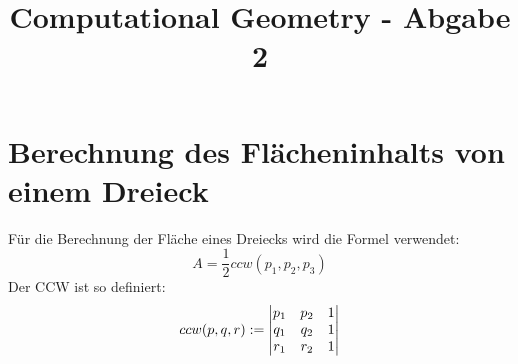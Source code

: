 \documentclass[conference]{IEEEtran}
\begin{document}
	
	\title{Computational Geometry - Abgabe 2}
	
	\author{
	}
	
	\maketitle
	
	\begin{abstract}
		
		
	\end{abstract}
	
	\section{Berechnung des Flächeninhalts von einem Dreieck}
	Für die Berechnung der Fläche eines Dreiecks wird die Formel verwendet:
	\[ A = \frac{1}{2} ccw(p_1,p_2,p_3) \]
	Der CCW ist so definiert: 
	\[ ccw(p,q,r) := 
	\begin{vmatrix}
		p_1 & p_2 & 1 \\ 
		q_1 & q_2 & 1 \\ 
		r_1 & r_2 & 1 \notag
	\end{vmatrix} \]
	
\end{document}
